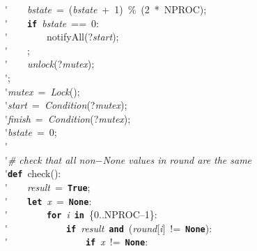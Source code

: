 \'\>~~~~\textit{bstate}~=~(\textit{bstate}~+~1)~\%~(2~*~NPROC);\\

\'\>~~~~\texttt{\textbf{if}}~\textit{bstate}~==~0:\\

\'\>~~~~~~~~notifyAll(?\textit{start});\\

\'\>~~~~;\\

\'\>~~~~\textit{unlock}(?\textit{mutex});\\

\'\>;\\

\'\>\textit{mutex}~=~\textit{Lock}();\\

\'\>\textit{start}~=~\textit{Condition}(?\textit{mutex});\\

\'\>\textit{finish}~=~\textit{Condition}(?\textit{mutex});\\

\'\>\textit{bstate}~=~0;\\

\'\>\\

\'\>\emph{\# check that all non$-$None values in round are the same}\\

\'\>\texttt{\textbf{def}}~check():\\

\'\>~~~~\textit{result}~=~\texttt{\textbf{True}};\\

\'\>~~~~\texttt{\textbf{let}}~\textit{x}~=~\texttt{\textbf{None}}:\\

\'\>~~~~~~~~\texttt{\textbf{for}}~\textit{i}~\texttt{\textbf{in}}~\{0..NPROC--1\}:\\

\'\>~~~~~~~~~~~~\texttt{\textbf{if}}~\textit{result}~\texttt{\textbf{and}}~(\textit{round}[\textit{i}]~!=~\texttt{\textbf{None}}):\\

\'\>~~~~~~~~~~~~~~~~\texttt{\textbf{if}}~\textit{x}~!=~\texttt{\textbf{None}}:\\

